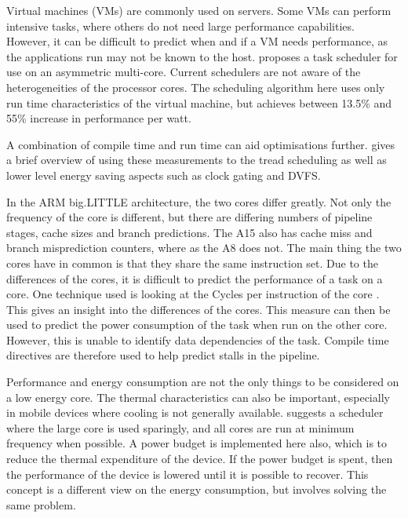 Virtual machines (VMs) are commonly used on servers. 
Some VMs can perform intensive tasks, where others do not need large performance capabilities.
However, it can be difficult to predict when and if a VM needs performance, as the applications run may not be known to the host. 
\cite{wang2012energy} proposes a task scheduler for use on an asymmetric multi-core. 
Current schedulers are not aware of the heterogeneities of the processor cores. 
The scheduling algorithm here uses only run time characteristics of the virtual machine, but achieves between 13.5\% and 55\% increase in performance per watt.

A combination of compile time and run time can aid optimisations further. 
\cite{de2012power} gives a brief overview of using these measurements to the tread scheduling as well as lower level energy saving aspects such as clock gating and DVFS. 


In the ARM big.LITTLE architecture, the two cores differ greatly. 
Not only the frequency of the core is different, but there are differing numbers of pipeline stages, cache sizes and branch predictions.
The A15 also has cache miss and branch misprediction counters, where as the A8 does not. 
The main thing the two cores have in common is that they share the same instruction set. 
Due to the differences of the cores, it is difficult to predict the performance of a task on a core.
One technique used is looking at the Cycles per instruction of the core \cite{pricopi2013power}. 
This gives an insight into the differences of the cores. 
This measure can then be used to predict the power consumption of the task when run on the other core. 
However, this is unable to identify data dependencies of the task. 
Compile time directives are therefore used to help predict stalls in the pipeline. 


Performance and energy consumption are not the only things to be considered on a low energy core.
The thermal characteristics can also be important, especially in mobile devices where cooling is not generally available. 
\cite{muthukaruppan2013hierarchical} suggests a scheduler where the large core is used sparingly, and all cores are run at minimum frequency when possible. 
A power budget is implemented here also, which is to reduce the thermal expenditure of the device. 
If the power budget is spent, then the performance of the device is lowered until it is possible to recover. 
This concept is a different view on the energy consumption, but involves solving the same problem. 


